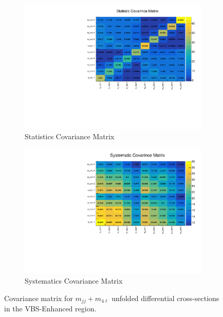 \begin{figure}[!htb]
    \centering
    \begin{subfigure}{.49\textwidth}
        \centering
        \includegraphics[width=.98\linewidth]{figures/Results/EFT/Cov_stat.pdf}
        \caption{ Statistics Covariance Matrix \label{fig:StatCov_mjj_m4l}}
    \end{subfigure}
    \begin{subfigure}{.49\textwidth}
        \centering
        \includegraphics[width=.98\linewidth]{figures/Results/EFT/Cov_syst.pdf}
        \caption{ Systematics Covariance Matrix \label{fig:SysCov_mjj_m4l} }
    \end{subfigure}
    \caption{Covariance matrix for $m_{jj}+m_{4\ell}$ unfolded differential cross-sections in the VBS-Enhanced region. }  \label{fig:Cov_mjj_m4l}
\end{figure}
